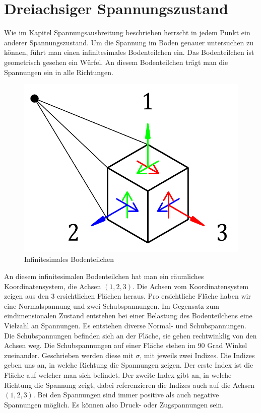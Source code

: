 \section{Dreiachsiger Spannungszustand\label{spannung:section:Dreiachsiger_Spannungszustand}}
Wie im Kapitel Spannungsausbreitung beschrieben herrscht in jedem Punkt ein anderer Spannungszustand.
Um die Spannung im Boden genauer untersuchen zu können, führt man einen infinitesimales Bodenteilchen ein.
Das Bodenteilchen ist geometrisch gesehen ein Würfel.
An diesem Bodenteilchen trägt man die Spannungen ein in alle Richtungen.

\begin{figure}
	\centering
	\includegraphics[width=0.5\linewidth,keepaspectratio]{papers/spannung/Grafiken/infinitesimalerWuerfel.png}
	\caption{Infinitesimales Bodenteilchen}
	\label{fig:infintesimaler-wurfel}
\end{figure}

An diesem infinitesimalen Bodenteilchen hat man ein räumliches Koordinatensystem, die Achsen $(1,2,3)$.
Die Achsen vom Koordinatensystem zeigen aus den 3 ersichtlichen Flächen heraus.
Pro ersichtliche Fläche haben wir eine Normalspannung und zwei Schubspannungen.
Im Gegensatz zum eindimensionalen Zustand entstehen bei einer Belastung des Bodenteilchens eine Vielzahl an Spannungen.
Es entstehen diverse Normal- und Schubspannungen.
Die Schubspannungen befinden sich an der Fläche, sie gehen rechtwinklig von den Achsen weg.
Die Schubspannungen auf einer Fläche stehen im 90 Grad Winkel zueinander.
Geschrieben werden diese mit $\sigma$, mit jeweils zwei Indizes.
Die Indizes geben uns an, in welche Richtung die Spannungen zeigen.
Der erste Index ist die Fläche auf welcher man sich befindet.
Der zweite Index gibt an, in welche Richtung die Spannung zeigt, dabei referenzieren die Indizes auch auf die Achsen $(1,2,3)$.
Bei den Spannungen sind immer positive als auch negative Spannungen möglich.
Es können also Druck- oder Zugspannungen sein.


